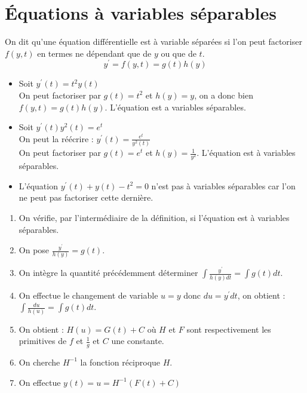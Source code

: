 \section{Équations à variables séparables}
\begin{defi}
On dit qu'une équation différentielle est à variable séparées si l'on peut factoriser $f(y,t)$ en termes ne dépendant que de $y$ ou que de $t$.
$$y^{\prime}=f(y,t)=g(t)h(y)$$
\end{defi}
\begin{ex}
\begin{itemize}
    \item Soit $y^{\prime}(t)=t^2y(t)$ \\
    On peut factoriser par $g(t)=t^2$ et $h(y)=y$, on a donc bien $f(y,t)=g(t)h(y)$. L'équation est a variables séparables.
    \\
    \item Soit $y^{\prime}(t)y^2(t)=e^t$\\
    On peut la réécrire : $y^{\prime}(t)=\frac{e^t}{y^2(t)}$\\
    On peut factoriser par $g(t)=e^t$ et $h(y)=\frac{1}{y^2}$. L'équation est à variables séparables.\\
    \item L'équation $y^{\prime}(t)+y(t)-t^2=0$ n'est pas à variables séparables car l'on ne peut pas factoriser cette dernière.
\end{itemize}
\end{ex}
\begin{meth}
\begin{enumerate}
    \item On vérifie, par l'intermédiaire de la définition, si l'équation est à variables séparables.
    \item On pose $\frac{y^{\prime}}{h(y)}=g(t)$.
    \item On intègre la quantité précédemment déterminer $\int \frac{y^{\prime}}{h(y)dt}=\int g(t)dt$.
    \item On effectue le changement de variable $u=y$ donc $du=y^{\prime}dt$, on obtient :\\ $\int\frac{du}{h(u)}=\int g(t) dt$.
    \item On obtient : $H(u)=G(t)+C$ où $H$ et $F$ sont respectivement les primitives de $f$ et $\frac{1}{g}$ et $C$ une constante.
    \item On cherche $H^{-1}$ la fonction réciproque $H$.
    \item On effectue $y(t)=u=H^{-1}(F(t)+C)$
\end{enumerate}
\end{meth}
